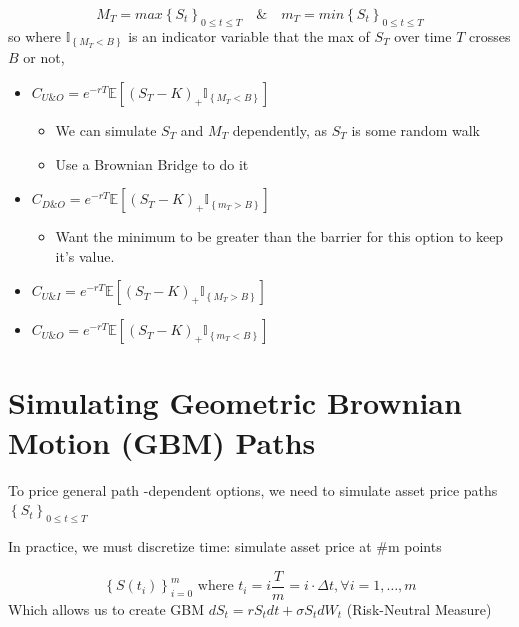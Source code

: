 \documentclass[
  oneside]{book}
\providecommand{\tightlist}{%
  \setlength{\itemsep}{0pt}\setlength{\parskip}{0pt}}
\begin{document}
\[
M_{T} = max\left\{ S_{t} \right\} _{0\leq t\leq T} \quad \& \quad m_{T} = min\left\{ S_{t} \right\} _{0\leq t\leq T}
\]
so where \(\mathbb{I}_{\left\{ M_{T}<B \right\}}\) is an indicator variable that the max of \(S_{T}\) over time \(T\) crosses \(B\) or not,

\begin{itemize}
\tightlist
\item
  \(C_{U\&O} = e^{-rT}\mathbb{E}\left[ (S_{T}-K)_{+}\mathbb{I}_{\left\{ M_{T}<B \right\}} \right]\)

  \begin{itemize}
  \tightlist
  \item
    We can simulate \(S_{T}\) and \(M_{T}\) dependently, as \(S_{T}\) is some random walk
  \item
    Use a Brownian Bridge to do it
  \end{itemize}
\item
  \(C_{D\&O} = e^{-rT}\mathbb{E}\left[ (S_{T}-K)_{+}\mathbb{I}_{\left\{ m_{T}>B \right\}} \right]\)

  \begin{itemize}
  \tightlist
  \item
    Want the minimum to be greater than the barrier for this option to keep it's value.
  \end{itemize}
\item
  \(C_{U\&I} = e^{-rT}\mathbb{E}\left[ (S_{T}-K)_{+}\mathbb{I}_{\left\{ M_{T}>B \right\}} \right]\)
\item
  \(C_{U\&O} = e^{-rT}\mathbb{E}\left[ (S_{T}-K)_{+}\mathbb{I}_{\left\{ m_{T}<B \right\}} \right]\)
\end{itemize}

\hypertarget{simulating-geometric-brownian-motion-gbm-paths}{%
\section{Simulating Geometric Brownian Motion (GBM) Paths}\label{simulating-geometric-brownian-motion-gbm-paths}}

To price general path -dependent options, we need to simulate asset price paths \(\left\{ S_{t} \right\}_{0\leq t\leq T}\)

In practice, we must discretize time: simulate asset price at \#m points

\[
\left\{ S(t_{i}) \right\} ^{m}_{i=0} \text{ where }t_{i} = i \frac{T}{m} = i \cdot \Delta t, \forall i = 1,\dots ,m
\]
Which allows us to create GBM \(dS_{t} = rS_{t}dt+\sigma S_{t}dW_{t}\) (Risk-Neutral Measure)
\end{document}
